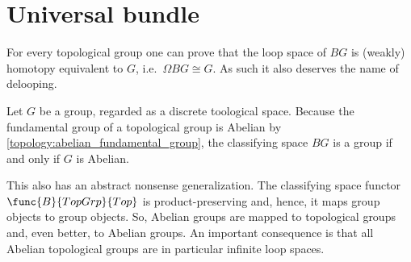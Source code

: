 \section{Universal bundle}

    \begin{property}[Delooping]\label{bundle:delooping}
        For every topological group one can prove that the loop space of $BG$ is (weakly) homotopy equivalent to $G$, i.e.~$\Omega BG\cong G$. As such it also deserves the name of delooping.
    \end{property}
    \begin{property}[Groups]
        Let $G$ be a group, regarded as a discrete toological space. Because the fundamental group of a topological group is Abelian by \cref{topology:abelian_fundamental_group}, the classifying space $BG$ is a group if and only if $G$ is Abelian.

        This also has an abstract nonsense generalization. The classifying space functor $\func{B}{TopGrp}{Top}$ is product-preserving and, hence, it maps group objects to group objects. So, Abelian groups are mapped to topological groups and, even better, to Abelian groups. An important consequence is that all Abelian topological groups are in particular infinite loop spaces.
    \end{property}

